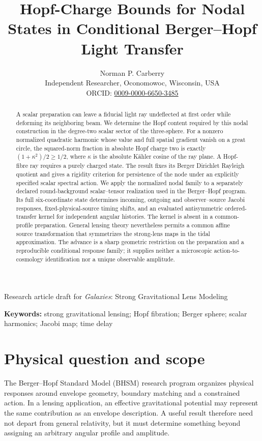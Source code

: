 \documentclass[11pt,a4paper]{article}
\title{\textbf{Hopf-Charge Bounds for Nodal States in Conditional Berger--Hopf Light Transfer}}
\author{Norman P. Carberry\\\small Independent Researcher, Oconomowoc, Wisconsin, USA\\
\small ORCID: \href{https://orcid.org/0009-0000-6650-3485}{0009-0000-6650-3485}}
\date{}
\begin{document}
\maketitle
\begin{center}\small Research article draft for \emph{Galaxies}: Strong Gravitational Lens Modeling\end{center}
\begin{abstract}
A scalar preparation can leave a fiducial light ray undeflected at first
order while deforming its neighboring beam. We determine the Hopf content
required by this nodal construction in the degree-two scalar sector of
the three-sphere. For a nonzero normalized quadratic harmonic whose value
and full spatial gradient vanish on a great circle, the squared-norm
fraction in absolute Hopf charge two is exactly $(1+\kappa^2)/2\ge1/2$,
where $\kappa$ is the absolute K\"ahler cosine of the ray plane. A Hopf-fibre
ray requires a purely charged state. The result fixes its Berger Dirichlet
Rayleigh quotient and gives a rigidity criterion for persistence of the
node under an explicitly specified scalar spectral action. We apply the
normalized nodal family to a separately declared round-background
scalar--tensor realization used in the Berger--Hopf program. Its full
six-coordinate state determines incoming, outgoing and observer--source
Jacobi responses, fixed-physical-source timing shifts, and an evaluated
antisymmetric ordered-transfer kernel for independent angular histories.
The kernel is absent in a common-profile preparation. General lensing
theory nevertheless permits a common affine source transformation that
symmetrizes the strong-lens maps in the tidal approximation. The advance
is a sharp geometric restriction on the preparation and a reproducible
conditional response family; it supplies neither a microscopic
action-to-cosmology identification nor a unique observable amplitude.
\end{abstract}
\noindent\textbf{Keywords:} strong gravitational lensing; Hopf fibration;
Berger sphere; scalar harmonics; Jacobi map; time delay

\section{Physical question and scope}

The Berger--Hopf Standard Model (BHSM) research program organizes physical
responses around envelope geometry, boundary matching and a constrained
action. In a lensing application, an effective gravitational potential may
represent the same contribution as an envelope description. A useful result
therefore need not depart from general relativity, but it must determine
something beyond assigning an arbitrary angular profile and amplitude.
\end{document}
